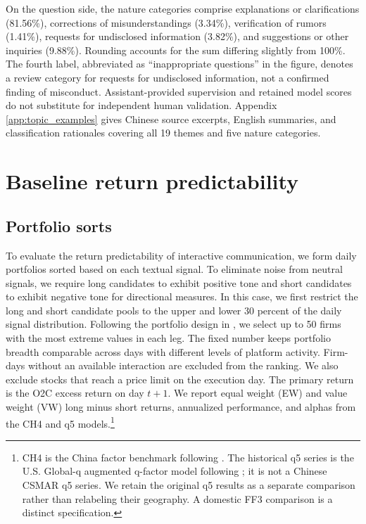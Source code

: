 \documentclass[12pt]{article}
\begin{document}
On the question side, the nature categories comprise explanations or clarifications (81.56\%), corrections of misunderstandings (3.34\%), verification of rumors (1.41\%), requests for undisclosed information (3.82\%), and suggestions or other inquiries (9.88\%). Rounding accounts for the sum differing slightly from 100\%. The fourth label, abbreviated as ``inappropriate questions'' in the figure, denotes a review category for requests for undisclosed information, not a confirmed finding of misconduct. Assistant-provided supervision and retained model scores do not substitute for independent human validation. Appendix \ref{app:topic_examples} gives Chinese source excerpts, English summaries, and classification rationales covering all 19 themes and five nature categories.

\section{Baseline return predictability}\label{sec:baseline_return_predictability}
 

\subsection{Portfolio sorts}

To evaluate the return predictability of interactive communication, we form daily portfolios sorted based on each textual signal. To eliminate noise from neutral signals, we require long candidates to exhibit positive tone and short candidates to exhibit negative tone for directional measures. In this case, we first restrict the long and short candidate pools to the upper and lower 30 percent of the daily signal distribution. Following the portfolio design in \citet{ke2021predicting}, we select up to 50 firms with the most extreme values in each leg. The fixed number keeps portfolio breadth comparable across days with different levels of platform activity. Firm-days without an available interaction are excluded from the ranking. We also exclude stocks that reach a price limit on the execution day. The primary return is the O2C excess return on day $t+1$. We report equal weight (EW) and value weight (VW) long minus short returns, annualized performance, and alphas from the CH4 and q5 models.\footnote{CH4 is the China factor benchmark following \citet{liu2019}. The historical q5 series is the U.S. Global-q augmented q-factor model following \citet{hou2021}; it is not a Chinese CSMAR q5 series. We retain the original q5 results as a separate comparison rather than relabeling their geography. A domestic FF3 comparison is a distinct specification.}
\end{document}
